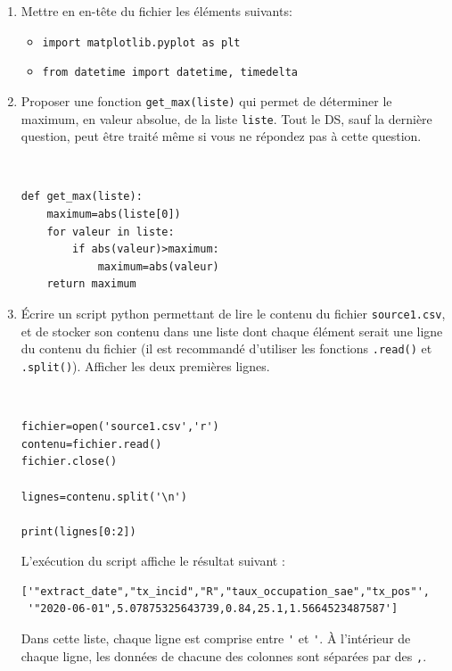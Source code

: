 \begin{enumerate}
\item  Mettre en en-tête du fichier les éléments suivants:
 \begin{itemize}
  \item \verb?import matplotlib.pyplot as plt?
  \item \verb?from datetime import datetime, timedelta?
 \end{itemize}
 
\item Proposer une fonction \verb?get_max(liste)? qui permet de déterminer le maximum, en valeur absolue, de la liste \verb?liste?. Tout le DS, sauf la dernière question, peut être traité même si vous ne répondez pas à cette question.

\begin{solution}~\ \\
\begin{verbatim}
def get_max(liste):
    maximum=abs(liste[0])
    for valeur in liste:
        if abs(valeur)>maximum:
            maximum=abs(valeur)
    return maximum
\end{verbatim}
\end{solution}


\item[3.1] Écrire un script python permettant de lire le contenu du fichier \verb?source1.csv?, et de stocker son contenu dans une liste dont chaque élément serait une ligne du contenu du fichier (il est recommandé d'utiliser les fonctions \verb?.read()? et \verb?.split()?). Afficher les deux premières lignes.

 \begin{solution}~\ \\
  \begin{verbatim}
fichier=open('source1.csv','r')
contenu=fichier.read()
fichier.close()
	
lignes=contenu.split('\n')

print(lignes[0:2])
 \end{verbatim}
\end{solution}

L'exécution du script affiche le résultat suivant :
\begin{verbatim}
['"extract_date","tx_incid","R","taux_occupation_sae","tx_pos"',
 '"2020-06-01",5.07875325643739,0.84,25.1,1.5664523487587']
\end{verbatim}

Dans cette liste, chaque ligne est comprise entre \verb?'? et \verb?'?. À l'intérieur de chaque ligne, les données de chacune des colonnes sont séparées par des \verb?,?. 


\end{enumerate}
